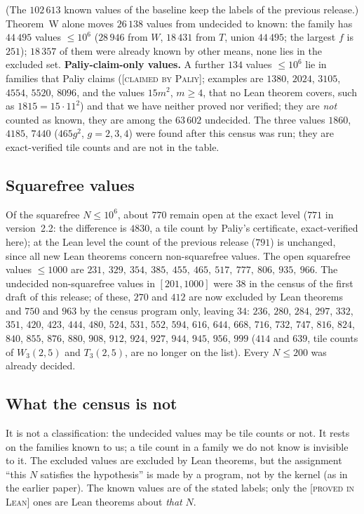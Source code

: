 \documentclass[11pt,reqno]{amsart}
\theoremstyle{plain}
\theoremstyle{definition}
\newcommand{\lab}[1]{\textup{[\textsc{#1}]}}
\newcommand{\PL}{\lab{proved in Lean}}
\newcommand{\CP}{\lab{claimed by Paliy}}
\begin{document}
(The $102\,613$ known values of the baseline keep the labels of the previous release.)
Theorem~W alone moves $26\,138$ values from undecided to known: the family has $44\,495$ values $\le10^6$ ($28\,946$ from $W$, $18\,431$ from $T$, union $44\,495$; the largest $f$ is $251$); $18\,357$ of them were already known by other means, none lies in the excluded set.
\textbf{Paliy-claim-only values.} A further $134$ values $\le10^6$ lie in families that Paliy claims (\CP{}; examples are $1380$, $2024$, $3105$, $4554$, $5520$, $8096$, and the values $15m^2$, $m\ge4$, that no Lean theorem covers, such as $1815=15\cdot11^2$) and that we have neither proved nor verified; they are \emph{not} counted as known, they are among the $63\,602$ undecided. The three values $1860$, $4185$, $7440$ ($465g^2$, $g=2,3,4$) were found after this census was run; they are exact-verified tile counts and are not in the table.

\subsection{Squarefree values}
Of the squarefree $N\le10^6$, about $770$ remain open at the exact level ($771$ in version~2.2: the difference is $4830$, a tile count by Paliy's certificate, exact-verified here); at the Lean level the count of the previous release ($791$) is unchanged, since all new Lean theorems concern non-squarefree values.
The open squarefree values $\le1000$ are $231,\ 329,\ 354,\ 385,\ 455,\ 465,\ 517,\ 777,\ 806,\ 935,\ 966$.
The undecided non-squarefree values in $[201,1000]$ were $38$ in the census of the first draft of this release; of these, $270$ and $412$ are now excluded by Lean theorems and $750$ and $963$ by the census program only, leaving $34$: $236$, $280$, $284$, $297$, $332$, $351$, $420$, $423$, $444$, $480$, $524$, $531$, $552$, $594$, $616$, $644$, $668$, $716$, $732$, $747$, $816$, $824$, $840$, $855$, $876$, $880$, $908$, $912$, $924$, $927$, $944$, $945$, $956$, $999$ ($414$ and $639$, tile counts of $W_3(2,5)$ and $T_3(2,5)$, are no longer on the list).
Every $N\le200$ was already decided.

\subsection{What the census is not}
It is not a classification: the undecided values may be tile counts or not. It rests on the families known to us; a tile count in a family we do not know is invisible to it.
The excluded values are excluded by Lean theorems, but the assignment ``this $N$ satisfies the hypothesis'' is made by a program, not by the kernel (as in the earlier paper).
The known values are of the stated labels; only the \PL{} ones are Lean theorems about \emph{that} $N$.
\end{document}
